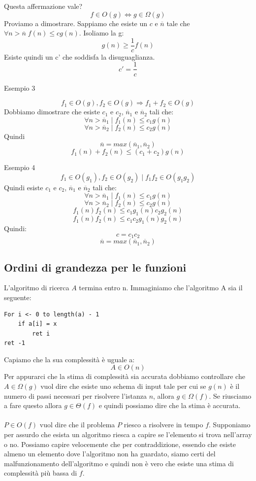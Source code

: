 \documentclass[a4paper]{article}
\begin{document}
\ex{}
{
Questa affermazione vale?
\[f \in O(g) \Longleftrightarrow g \in \Omega(g)\]
Proviamo a dimostrare. Sappiamo che esiste un $c$ e $\overline{n}$ tale che \(\forall n > \overline{n} \; f(n) \le cg(n)\). Isoliamo la g:
\[g(n) \ge \frac{1}{c} f(n)\]
Esiste quindi un c' che soddisfa la disuguaglianza.
\[c' = \frac{1}{c}\]
}
\begin{examplebox}{Esempio 3}

\[f_1 \in O(g),
f_2 \in O(g) \Longrightarrow f_1 + f_2 \in O(g)
\]
Dobbiamo dimostrare che esiste $c_1$ e $c_2$, $\overline{n}_1$ e $\overline{n}_2$ tali che:
\[\forall n > \overline{n}_1 \; | \; f_1(n) \le c_1g(n)\]
\[\forall n > \overline{n}_2 \; | \; f_2(n) \le c_2g(n)\]
Quindi
\[\overline{n} = max(\overline{n}_1, \overline{n}_2)\]
\[f_1(n) + f_2(n) \le (c_1 + c_2)g(n)\]

\end{examplebox}

\begin{examplebox}{Esempio 4}
    \[f_1 \in O(g_1), f_2 \in O(g_2) \; | \; f_1f_2 \in O(g_1g_2)\]
Quindi esiste $c_1$ e $c_2$, $\overline{n}_1$ e $\overline{n}_2$ tali che:
\[\forall n > \overline{n}_1 \; | \; f_1(n) \le c_1g(n)\]
\[\forall n > \overline{n}_2 \; | \; f_2(n) \le c_2g(n)\]
\[f_1(n)f_2(n) \le c_1g_1(n)c_2g_2(n)\]
\[f_1(n)f_2(n) \le c_1c_2g_1(n)g_2(n)\]
Quindi:
 \[c = c_1c_2\] \[\overline{n} = max(\overline{n}_1, \overline{n}_2)\]
\end{examplebox}

\subsection{Ordini di grandezza per le funzioni}

L'algoritmo di ricerca $A$ termina entro n. Immaginiamo che l'algoritmo A sia il seguente:
\begin{lstlisting}
For i <- 0 to length(a) - 1
    if a[i] = x
        ret i
ret -1
\end{lstlisting}
Capiamo che la sua complessità è uguale a:
\[A \in O(n)\]
Per appurarci che la stima di complessità sia accurata dobbiamo controllare che $A \in \Omega(g)$ vuol dire che esiste uno schema di input tale per cui se $g(n)$ è il numero di passi necessari per risolvere l'istanza $n$, allora $g \in \Omega(f)$. Se riusciamo a fare questo allora $g \in \Theta(f)$ e quindi possiamo dire che la stima è accurata.
\\\\
$P \in O(f)$ vuol dire che il problema $P$ riesco a risolvere in tempo $f$. Supponiamo per assurdo che esista un algoritmo riesca a capire se l'elemento si trova nell'array o no. Possiamo capire velocemente che per contraddizione, essendo che esiste almeno un elemento dove l'algoritmo non ha guardato, siamo certi del malfunzionamento dell'algoritmo e quindi non è vero che esiste una stima di complessità più bassa di $f$.
\end{document}
